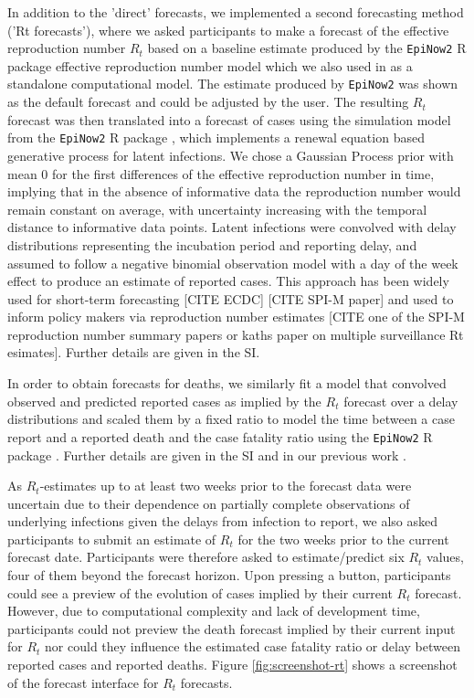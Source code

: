 \documentclass[10pt,a4paper,twocolumn]{article}
\begin{document}
In addition to the 'direct' forecasts, we implemented a second forecasting method ('Rt forecasts'), where we asked participants to make a forecast of the effective reproduction number $R_t$ based on a baseline estimate produced by the \texttt{EpiNow2} \textsf{R} package effective reproduction number model \citep{epinow2} which we also used in \cite{bosseComparingHumanModelbased2022} as a standalone computational model. The estimate produced by \texttt{EpiNow2} was shown as the default forecast and could be adjusted by the user. The resulting $R_t$ forecast was then translated into a forecast of cases using the simulation model from the \texttt{EpiNow2} \textsf{R} package \citep{epinow2}, which implements a renewal equation based \citep{fraserEstimatingIndividualHousehold2007} generative process for latent infections. We chose a Gaussian Process prior with mean 0 for the first differences of the effective reproduction number in time, implying that in the absence of informative data the reproduction number would remain constant on average, with uncertainty increasing with the temporal distance to informative data points. Latent infections were convolved with delay distributions representing the incubation period and reporting delay, and assumed to follow a negative binomial observation model with a day of the week effect to produce an estimate of reported cases. This approach has been widely used for short-term forecasting \cite{bosseComparingHumanModelbased2022} [CITE ECDC] [CITE SPI-M paper] and used to inform policy makers via reproduction number estimates [CITE one of the SPI-M reproduction number summary papers or kaths paper on multiple surveillance Rt esimates]. Further details are given in the SI.

In order to obtain forecasts for deaths, we similarly fit a model that convolved observed and predicted reported cases as implied by the $R_t$ forecast over a  delay distributions \cite{sherrattExploringSurveillanceData2021, abbottEstimatingTimevaryingReproduction2020a} and scaled them by a fixed ratio to model the time between a case report and a reported death and the case fatality ratio using the \texttt{EpiNow2} \textsf{R} package \citep{epinow2}. Further details are given in the SI and in our previous work \citep{bosseComparingHumanModelbased2022}.

As $R_t$-estimates up to at least two weeks prior to the forecast data were uncertain due to their dependence on partially complete observations of underlying infections given the delays from infection to report, we also asked participants to submit an estimate of $R_t$ for the two weeks prior to the current forecast date. Participants were therefore asked to estimate/predict six $R_t$ values, four of them beyond the forecast horizon. Upon pressing a button, participants could see a preview of the evolution of cases implied by their current $R_t$ forecast. However, due to computational complexity and lack of development time, participants could not preview the death forecast implied by their current input for $R_t$ nor could they influence the estimated case fatality ratio or delay between reported cases and reported deaths. Figure \ref{fig:screenshot-rt} shows a screenshot of the forecast interface for $R_t$ forecasts. 
\end{document}
